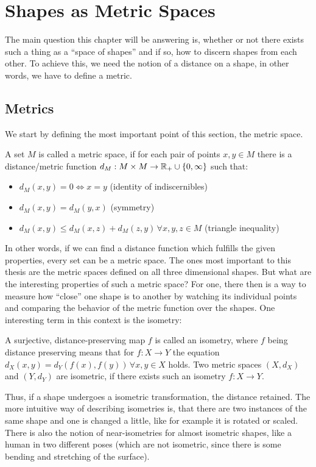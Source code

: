 \chapter{Shapes as Metric Spaces}
\label{chapter:shapeSpaces}
The main question this chapter will be answering is, whether or not there exists such a thing as a ``space of shapes'' and if so, how to discern shapes from each other.
To achieve this, we need the notion of a distance on a shape, in other words, we have to define a metric.

\section{Metrics}
We start by defining the most important point of this section, the metric space.
\begin{mydef}
	A set $M$ is called a metric space, if for each pair of points $x,y \in M$ there is a distance/metric function $d_M: M \times M \rightarrow \mathbb{R}_+ \cup \{0,\infty\}$ such that:
	\begin{itemize}
		\item $d_M(x,y) = 0 \Leftrightarrow x = y$ (identity of indiscernibles)
		\item $d_M(x,y) = d_M(y,x)$ (symmetry)
		\item $d_M(x,y) \le d_M(x,z) + d_M(z,y)\,\forall x,y,z \in M$ (triangle inequality)
	\end{itemize}
\end{mydef}
In other words, if we can find a distance function which fulfills the given properties, every set can be a metric space.
The ones most important to this thesis are the metric spaces defined on all three dimensional shapes.
But what are the interesting properties of such a metric space?
For one, there then is a way to measure how ``close'' one shape is to another by watching its individual points and comparing the behavior of the metric function over the shapes.
One interesting term in this context is the isometry:
\begin{mydef}
	A surjective, distance-preserving map $f$ is called an isometry, where $f$ being distance preserving means that for $f :X \rightarrow Y$ the equation $d_X(x,y) = d_Y(f(x),f(y)) \,\forall x,y \in X$ holds.
	Two metric spaces $(X,d_X)$ and $(Y,d_Y)$ are isometric, if there exists such an isometry $f :X \rightarrow Y$.
\end{mydef}
Thus, if a shape undergoes a isometric transformation, the distance retained.
The more intuitive way of describing isometries is, that there are two instances of the same shape and one is changed a little, like for example it is rotated or scaled.
There is also the notion of near-isometries for almost isometric shapes, like a human in two different poses (which are not isometric, since there is some bending and stretching of the surface).

